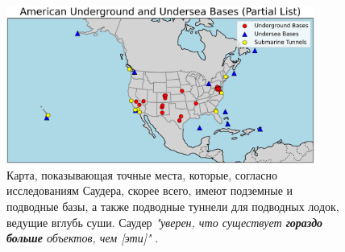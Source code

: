 \documentclass[10pt,twocolumn,letterpaper]{article}
\begin{document}
\begin{figure}[t]
\begin{center}
\includegraphics[width=0.9\textwidth]{basescrop.png}
\end{center}
   \caption{Карта, показывающая точные места, которые, согласно исследованиям Саудера, скорее всего, имеют подземные и подводные базы, а также подводные туннели для подводных лодок, ведущие вглубь суши. Саудер \textit{"уверен, что существует \textbf{гораздо больше} объектов, чем [эти]"} \cite{22}.}
   \label{fig:4}
\end{figure}
\end{document}
